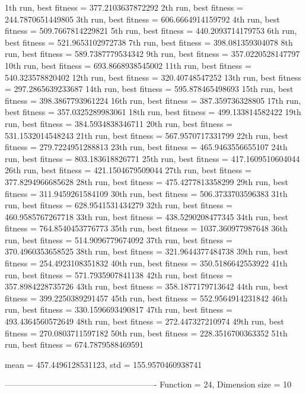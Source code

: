 1th run, best fitness = 377.2103637872292
2th run, best fitness = 244.7870651449805
3th run, best fitness = 606.6664914159792
4th run, best fitness = 509.7667814229821
5th run, best fitness = 440.2093714179753
6th run, best fitness = 521.9653102972738
7th run, best fitness = 398.081359304078
8th run, best fitness = 589.7387779534342
9th run, best fitness = 357.0220528147797
10th run, best fitness = 693.8668938545002
11th run, best fitness = 540.323578820402
12th run, best fitness = 320.40748547252
13th run, best fitness = 297.2865639233687
14th run, best fitness = 595.878465498693
15th run, best fitness = 398.3867793961224
16th run, best fitness = 387.359736328805
17th run, best fitness = 357.0325289983061
18th run, best fitness = 499.133814582422
19th run, best fitness = 384.5934838346711
20th run, best fitness = 531.1532014548243
21th run, best fitness = 567.9570717331799
22th run, best fitness = 279.7224951288813
23th run, best fitness = 465.9463556655107
24th run, best fitness = 803.183618826771
25th run, best fitness = 417.1609510604044
26th run, best fitness = 421.1504679509044
27th run, best fitness = 377.8294966685628
28th run, best fitness = 475.4277813358299
29th run, best fitness = 311.9459261584109
30th run, best fitness = 506.3733703596383
31th run, best fitness = 628.9541531434279
32th run, best fitness = 460.9585767267718
33th run, best fitness = 438.5290208477345
34th run, best fitness = 764.8540453776773
35th run, best fitness = 1037.360977987648
36th run, best fitness = 514.9096779674092
37th run, best fitness = 370.4960353658525
38th run, best fitness = 321.9644377484738
39th run, best fitness = 254.4923108351832
40th run, best fitness = 350.5186642553922
41th run, best fitness = 571.7935907841138
42th run, best fitness = 357.8984228735726
43th run, best fitness = 358.1877179713642
44th run, best fitness = 399.2250389291457
45th run, best fitness = 552.9564914231842
46th run, best fitness = 330.1596693490817
47th run, best fitness = 493.4364560572649
48th run, best fitness = 272.447327210974
49th run, best fitness = 270.0803711597182
50th run, best fitness = 228.3516700363352
51th run, best fitness = 674.7879588469591

mean = 457.4496128531123, std = 155.9570460938741

-------------------------------------------------------
Function = 24, Dimension size = 10

